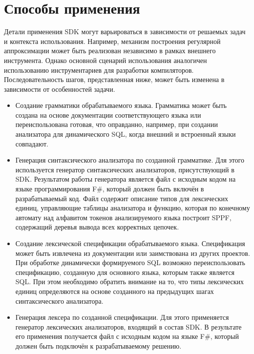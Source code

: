 \section{Способы применения}

Детали применения SDK могут варьироваться в зависимости от решаемых задач и контекста использования. Например, механизм построения регулярной аппроксимации может быть реализован независимо в рамках внешнего инструмента. Однако основной сценарий использования аналогичен использованию инструментариев для разработки компиляторов. Последовательность шагов, представленная ниже, может быть изменена в зависимости от особенностей задачи.

\begin{itemize}
    \item Создание грамматики обрабатываемого языка. Грамматика может быть создана на основе документации соответствующего языка или переиспользована готовая, что оправданно, например, при создании анализатора для динамического SQL, когда внешний и встроенный языки совпадают.
    \item Генерация синтаксического анализатора по созданной грамматике. Для этого используется генератор синтаксических анализаторов, присутствующий в SDK. Результатом работы генератора является файл с исходным кодом на языке программирования F\#, который должен быть включён в разрабатываемый код. Файл содержит описание типов для лексических единиц, управляющие таблицы анализатора и функцию, которая по конечному автомату над алфавитом токенов анализируемого языка построит SPPF, содержащий деревья вывода всех корректных цепочек.
    \item Создание лексической спецификации обрабатываемого языка. Спецификация может быть извлечена из документации или заимствована из других проектов. При обработке динамически формируемого SQL возможно переиспользовать спецификацию, созданную для основного языка, которым также является SQL. При этом необходимо обратить внимание на то, что типы лексических единиц определяются на основе созданного на предыдущих шагах синтаксического анализатора.
    \item Генерация лексера по созданной спецификации. Для этого применяется генератор лексических анализаторов, входящий в состав SDK. В результате его применения получается файл с исходным кодом на языке F\#, который должен быть подключён к разрабатываемому решению. 

\end{itemize}
